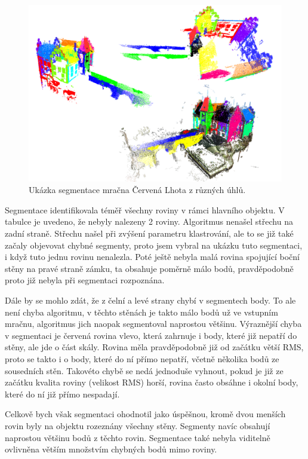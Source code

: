 \documentclass[11pt,twoside,a4paper]{book}
\begin{document}
\begin{figure}[ht]
\begin{center}
\includegraphics[width=\textwidth]{figures/test-cl}
\caption{Ukázka segmentace mračna Červená Lhota z různých úhlů.}
\label{fig:test-cl}
\end{center}
\end{figure}

Segmentace identifikovala téměř všechny roviny v rámci hlavního objektu. V tabulce je uvedeno, že nebyly nalezeny 2 roviny. Algoritmus nenašel střechu na zadní straně. Střechu našel při zvýšení parametru klastrování, ale to se již také začaly objevovat chybné segmenty, proto jsem vybral na ukázku tuto segmentaci, i když tuto jednu rovinu nenalezla. Poté ještě nebyla malá rovina spojující boční stěny na pravé straně zámku, ta obsahuje poměrně málo bodů, pravděpodobně proto již nebyla při segmentaci rozpoznána.

Dále by se mohlo zdát, že z čelní a levé strany chybí v segmentech body. To ale není chyba algoritmu, v těchto stěnách je takto málo bodů už ve vstupním mračnu, algoritmus jich naopak segmentoval naprostou většinu. Výraznější chyba v segmentaci je červená rovina vlevo, která zahrnuje i body, které již nepatří do stěny, ale jde o část skály. Rovina měla pravděpodobně již od začátku větší RMS, proto se takto  i o body, které do ní přímo nepatří, včetně několika bodů ze sousedních stěn. Takovéto chybě se nedá jednoduše vyhnout, pokud je již ze začátku kvalita roviny (velikost RMS) horší, rovina často obsáhne i okolní body, které do ní již přímo nespadají.

Celkově bych však segmentaci ohodnotil jako úspěšnou, kromě dvou menších rovin byly na objektu rozeznány všechny stěny. Segmenty navíc obsahují naprostou většinu bodů z těchto rovin. Segmentace také nebyla viditelně ovlivněna větším množstvím chybných bodů mimo roviny.
\end{document}
